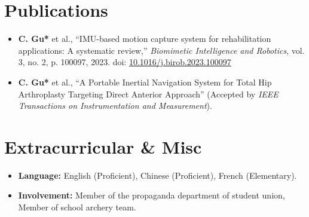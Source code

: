 \documentclass[letterpaper,10pt]{article}
\newcommand{\resumeItem}[1]{
  \item\small{
    {#1 \vspace{-4pt}}
  }
}
\newcommand{\resumeItemListStart}{\begin{itemize}}
\newcommand{\resumeItemListEnd}{\end{itemize}\vspace{-5pt}}
\begin{document}
\section{Publications}
\resumeItemListStart
  \resumeItem{\textbf{C. Gu*} et al., “IMU-based motion capture system for rehabilitation applications: A systematic
  review,” \textit{Biomimetic Intelligence and Robotics}, vol. 3, no. 2, p. 100097, 2023. doi: \href{https://doi.org/10.1016/j.birob.2023.100097}{10.1016/j.birob.2023.100097}}
  \resumeItem{\textbf{C. Gu*} et al., “A Portable Inertial Navigation System for Total Hip Arthroplasty Targeting Direct
  Anterior Approach” (Accepted by \textit{IEEE Transactions on Instrumentation and Measurement}).}
\resumeItemListEnd

\vspace{-8pt}
\section{Extracurricular \& Misc}
\resumeItemListStart
  \resumeItem{\textbf{Language:} English (Proficient), Chinese (Proficient), French (Elementary).}
  \resumeItem{\textbf{Involvement:} Member of the propaganda department of student union, Member of school archery team.}
\resumeItemListEnd
\end{document}
